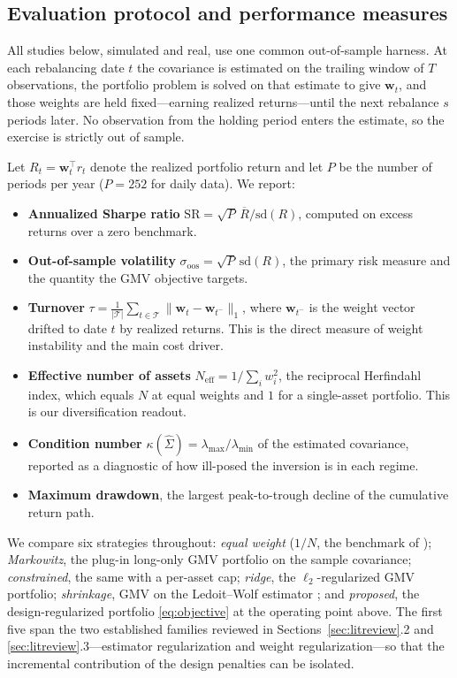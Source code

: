 \documentclass[11pt]{article}
\newcommand{\Sighat}{\hat\Sigma}
\newcommand{\w}{\mathbf{w}}
\newcommand{\lammin}{\lambda_{\min}}
\newcommand{\lammax}{\lambda_{\max}}
\newcommand{\Neff}{N_{\mathrm{eff}}}
\begin{document}
\subsection{Evaluation protocol and performance measures}
\label{sec:protocol}
All studies below, simulated and real, use one common out-of-sample harness. At
each rebalancing date $t$ the covariance is estimated on the trailing window of
$T$ observations, the portfolio problem is solved on that estimate to give
$\w_t$, and those weights are held fixed---earning realized returns---until the
next rebalance $s$ periods later. No observation from the holding period enters
the estimate, so the exercise is strictly out of sample.

Let $R_t=\w_t^\top r_t$ denote the realized portfolio return and let $P$ be the
number of periods per year ($P=252$ for daily data). We report:

\begin{itemize}[leftmargin=1.4em,itemsep=0.2em]
  \item \textbf{Annualized Sharpe ratio}
    $\mathrm{SR}=\sqrt{P}\,\overline{R}/\mathrm{sd}(R)$, computed on excess
    returns over a zero benchmark.
  \item \textbf{Out-of-sample volatility}
    $\sigma_{\mathrm{oos}}=\sqrt{P}\,\mathrm{sd}(R)$, the primary risk measure
    and the quantity the GMV objective targets.
  \item \textbf{Turnover} $\tau=\frac{1}{|\mathcal T|}\sum_{t\in\mathcal T}
    \lVert\w_t-\w_{t^-}\rVert_1$, where $\w_{t^-}$ is the weight vector drifted
    to date $t$ by realized returns. This is the direct measure of weight
    instability and the main cost driver.
  \item \textbf{Effective number of assets}
    $\Neff=1/\sum_iw_i^2$, the reciprocal Herfindahl index, which equals $N$ at
    equal weights and $1$ for a single-asset portfolio. This is our
    diversification readout.
  \item \textbf{Condition number} $\kappa(\Sighat)=\lammax/\lammin$ of the
    estimated covariance, reported as a diagnostic of how ill-posed the inversion
    is in each regime.
  \item \textbf{Maximum drawdown}, the largest peak-to-trough decline of the
    cumulative return path.
\end{itemize}

We compare six strategies throughout: \emph{equal weight} ($1/N$, the benchmark
of \citet{demiguel2009}); \emph{Markowitz}, the plug-in long-only GMV portfolio
on the sample covariance; \emph{constrained}, the same with a per-asset cap;
\emph{ridge}, the $\ell_2$-regularized GMV portfolio; \emph{shrinkage}, GMV on
the Ledoit--Wolf estimator \citep{ledoitwolf2004}; and \emph{proposed}, the
design-regularized portfolio \eqref{eq:objective} at the operating point above.
The first five span the two established families reviewed in
Sections~\ref{sec:litreview}.2 and \ref{sec:litreview}.3---estimator
regularization and weight regularization---so that the incremental contribution
of the design penalties can be isolated.
\end{document}
